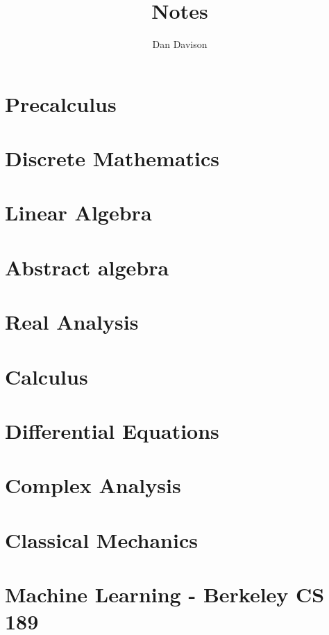 \documentclass{book}
\title{Notes}
\author{Dan Davison}
\begin{document}
\frontmatter
\maketitle
\tableofcontents
\mainmatter


\chapter{Precalculus}


\chapter{Discrete Mathematics}


\chapter{Linear Algebra}


\chapter{Abstract algebra}


\chapter{Real Analysis}


\chapter{Calculus}



\chapter{Differential Equations}


\chapter{Complex Analysis}


\chapter{Classical Mechanics}


\chapter{Machine Learning - Berkeley CS 189}


\end{document}

